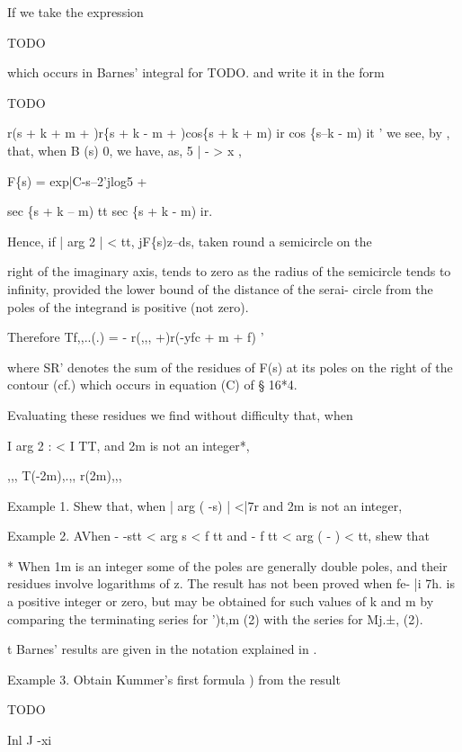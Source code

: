 If we take the
expression

TODO

which occurs in Barnes' integral for TODO. and write it in the form

TODO

r(s + k + m + )r\{s + k - m + )cos\{s + k + m) ir cos \{s--k - m)
it ' we see, by , that, when B (s)  0, we have, as, 5 | - > x
,

F\{s) = exp|C-s--2'jlog5 +

sec \{s + k -- m) tt sec \{s + k - m) ir.

Hence, if | arg 2 | <  tt, jF\{s)z--ds, taken round a semicircle
on the

right of the imaginary axis, tends to zero as the radius of the
semicircle tends to infinity, provided the lower bound of the distance
of the serai- circle from the poles of the integrand is positive (not
zero).

Therefore Tf,,..(.) = - r(,,, +)r(-yfc + m + f) '

where SR' denotes the sum of the residues of F(s) at its poles on the
right of the contour (cf.) which occurs in equation (C) of §
16*4.

Evaluating these residues we find without difficulty that, when

I arg 2 : < I TT, and 2m is not an integer*,

,,, T(-2m),.,, r(2m),,,

Example 1. Shew that, when | arg ( -s) | <|7r and 2m is not an
integer,

 Example 2. AVhen - -stt < arg s < f tt and - f tt < arg ( -
) < tt, shew that

* When 1m is an integer some of the poles are generally double poles,
and their residues involve logarithms of z. The result has not been
proved when fe- |i 7h. is a positive integer or zero, but may be
obtained for such values of k and m by comparing the terminating
series for ')t,m (2) with the series for Mj.±, (2).

t Barnes' results are given in the notation explained in .

%
%

Example 3. Obtain Kummer's first formula ) from the result

TODO 

Inl J -xi

